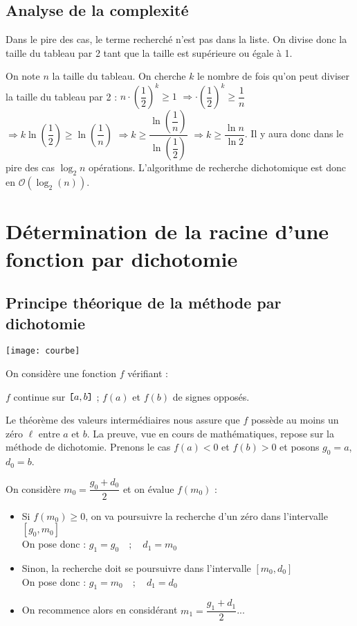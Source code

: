 \subsection{Analyse de la complexité}
Dans le pire des cas, le terme recherché n'est pas dans la liste. On divise donc la taille du tableau par 2 tant que la taille est supérieure ou égale à 1. 

On note $n$ la taille du tableau. On cherche $k$ le nombre de fois qu'on peut diviser la taille du tableau par 2 : 
$n\cdot\left(\dfrac{1}{2}\right)^k \geq 1$ 
$\Rightarrow \cdot\left(\dfrac{1}{2}\right)^k \geq \dfrac{1}{n}$
$\Rightarrow k \ln\left(\dfrac{1}{2}\right) \geq \ln\left(\dfrac{1}{n}\right)$
$\Rightarrow k \geq \dfrac{\ln\left(\dfrac{1}{n}\right)}{\ln\left(\dfrac{1}{2}\right)}$
$\Rightarrow k \geq \dfrac{\ln n}{\ln 2}$.
Il y aura donc dans le pire des cas $\log_2 n$ opérations.  L'algorithme de recherche dichotomique est donc en $\mathcal{O}(\log_2(n))$.

\section{Détermination de la racine d'une fonction par dichotomie}

\subsection{Principe théorique de la méthode par dichotomie}
%
\begin{marginfigure}
\texttt{[image: courbe]}
\end{marginfigure}
% 
On considère une fonction $f$ vérifiant : 
\begin{center} $f$ continue sur $\verb![!a,b\verb!]!$ ;  $f(a)$ et $f(b)$ de signes opposés.
\end{center} Le théorème des valeurs intermédiaires nous assure que $f$ possède au moins un zéro $\ell$ entre $a$ et $b$. La preuve, vue en cours de mathématiques, repose sur la méthode de dichotomie. Prenons le cas $f(a)<0$ et $f(b)>0$ et posons $g_0=a$, $d_0=b$. 


 On considère $m_0 = \dfrac{g_0+d_0}{2}$ et on évalue $f(m_0)$ : 
\begin{itemize}
 \item Si $f(m_0)\geq 0$, on va poursuivre la recherche d'un zéro dans l'intervalle  {$[g_0,m_0]$} \\On pose donc  : 
 $g_1 =  {g_0} \quad ;\quad  d_1 =  {m_0}$\vspace*{2mm}
  \item Sinon,  la recherche doit se poursuivre  dans l'intervalle  {$[m_0,d_0]$} \\ On pose donc  : 
 $g_1 =  {m_0} \quad ; \quad d_1 =  {d_0}$\vspace*{2mm}
 \item On recommence alors en considérant $m_1 = \dfrac{g_1+d_1}{2}$...\\
 \end{itemize}

